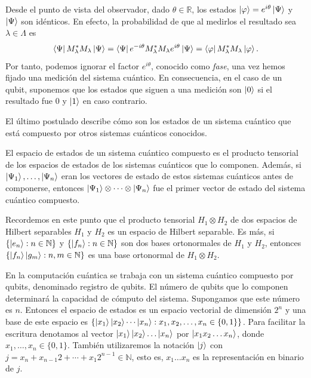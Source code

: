 \documentclass{article}
\begin{document}
  Desde el punto de vista del observador, dado $\theta \in \mathbb{R}$, los estados $\ket{\varphi} = e^{i \theta} \ket{\Psi}$ y $\ket{\Psi}$ son idénticos. En efecto, la probabilidad de que al medirlos el resultado sea $\lambda \in \Lambda$ es
  \[ \bra{\Psi}M_\lambda^* M_\lambda \ket{\Psi} = \bra{\Psi} e^{-i \theta} M_\lambda^* M_\lambda e^{i \theta} \ket{\Psi} = \bra{\varphi}M_\lambda^* M_\lambda \ket{\varphi}.\]
  Por tanto, podemos ignorar el factor $e^{i \theta}$, conocido como \emph{fase}, una vez hemos fijado una medición del sistema cuántico. En consecuencia, en el caso de un qubit, suponemos que los estados que siguen a una medición son $\ket{0}$ si el resultado fue $0$ y $\ket{1}$ en caso contrario. 

El último postulado describe cómo son los estados de un sistema cuántico que está compuesto por otros sistemas cuánticos conocidos.

\begin{postulate}
El espacio de estados de un sistema cuántico compuesto es el producto tensorial de los espacios de estados de los sistemas cuánticos que lo componen. Además, si $\ket{\Psi_1}, \ldots, \ket{\Psi_n}$ eran los vectores de estado de estos sistemas cuánticos antes de componerse, entonces $\ket{\Psi_1} \otimes \cdots \otimes \ket{\Psi_n}$ fue el primer vector de estado del sistema cuántico compuesto. 
\end{postulate}


Recordemos en este punto que el producto tensorial $H_1 \otimes H_2$ de dos espacios de Hilbert separables $H_1$ y $H_2$ es un espacio de Hilbert separable. Es más, si $\{\ket{e_n} : n \in \mathbb{N}\}$ y $\{\ket{f_n}: n \in \mathbb{N}\}$ son dos bases ortonormales de $H_1$ y $H_2$, entonces $\{\ket{f_n}\ket{g_m} : n,m \in \mathbb{N}\}$ es una base ortonormal de $H_1 \otimes H_2$.

En la computación cuántica se trabaja con un sistema cuántico compuesto por qubits, denominado registro de qubits. El número de qubits que lo componen determinará la capacidad de cómputo del sistema. %
Supongamos que este número es $n$. Entonces el espacio de estados es un espacio vectorial de dimensión $2^n$ y una base de este espacio es %
$\{\ket{x_1}\ket{x_2}\cdots\ket{x_n} : x_1, x_2, \ldots, x_n \in \{0,1\} \}$.
Para facilitar la escritura denotamos al vector $\ket{x_1}\ket{x_2}\ldots\ket{x_n}$ por $\ket{x_1 x_2 \ldots x_n}$, donde $x_1, \ldots, x_n \in \{0,1\}$. También utilizaremos la notación $\ket{j}$ con $j = x_n + x_{n-1}2 + \cdots + x_1 2^{n-1} \in \mathbb{N}$, esto es, $x_1 \ldots x_n$ es la representación en binario de $j$.
\end{document}
